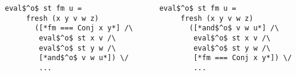 \begin{columns}
  \centering

  \begin{column}{0.35\textwidth}
    \begin{lstlisting}[frame=tb]
   eval$^o$ st fm u = 
     fresh (x y v w z) 
       ([*fm === Conj x y*] /\
        eval$^o$ st x v /\
        eval$^o$ st y w /\ 
        [*and$^o$ v w u*]) \/
        ... 
    \end{lstlisting}
  \end{column}
  
  \begin{column}{0.35\textwidth}
    \begin{lstlisting}[frame=tb]
   eval$^o$ st fm u = 
     fresh (x y v w z) 
       ([*and$^o$ v w u*] /\
        eval$^o$ st x v /\
        eval$^o$ st y w /\ 
        [*fm === Conj x y*]) \/
        ... 
    \end{lstlisting}
  \end{column}
\end{columns}